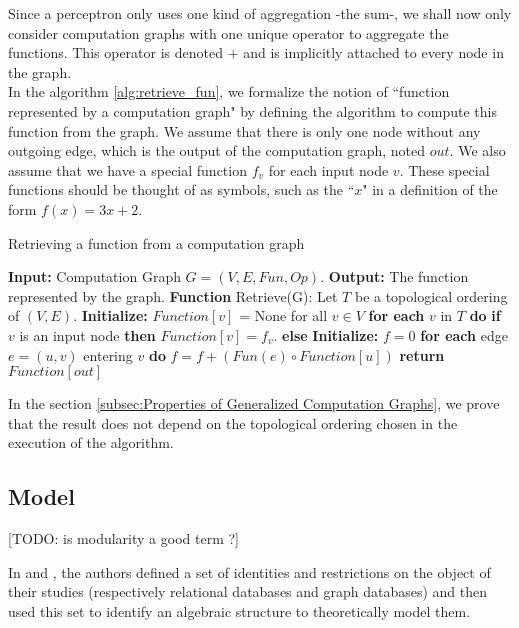 \documentclass[11pt,a4paper]{article}
\theoremstyle{definition}
\begin{document}
	Since a perceptron only uses one kind of aggregation -the sum-, we shall now only consider computation graphs with one unique operator to aggregate the functions. This operator is denoted $+$ and is implicitly attached to every node in the graph.\\

In the algorithm \ref{alg:retrieve_fun}, we formalize the notion of ``function represented by a computation graph" by defining the algorithm to compute this function from the graph. We assume that there is only one node without any outgoing edge, which is the output of the computation graph, noted $out$. We also assume that we have a special function $f_v$ for each input node $v$. These special functions should be thought of as symbols, such as the ``$x$" in a definition of the form $f(x)=3x+2$.


\begin{algorithm}
\caption{Retrieving a function from a computation graph}
\label{alg:retrieve_fun}
\begin{algorithmic}[1]
\STATE \textbf{Input:} Computation Graph $G = (V, E, Fun, Op)$.
\STATE \textbf{Output:} The function represented by the graph.
\STATE
\STATE \textbf{Function} Retrieve(G):
\STATE \quad Let $T$ be a topological ordering of $(V,E)$.
\STATE \quad \textbf{Initialize:} $Function[v]$ = None for all $v \in V$
\STATE \quad \textbf{for each} $v$ in $T$ \textbf{do}
\STATE \quad \quad \textbf{if} $v$ is an input node \textbf{then}
\STATE \quad \quad \quad $Function[v]=f_v$.
\STATE \quad \quad \textbf{else}
\STATE \quad \quad \quad \textbf{Initialize:} $f=0$
\STATE \quad \quad \quad \textbf{for each} edge $e=(u,v)$ entering $v$ \textbf{do}
\STATE \quad \quad \quad \quad $f=f + (Fun(e) \circ Function[u])$
\STATE \quad \textbf{return} $Function[out]$
\end{algorithmic}
\end{algorithm}

	In the section \ref{subsec:Properties of Generalized Computation Graphs}, we prove that the result does not depend on the topological ordering chosen in the execution of the algorithm.

\subsection{Model}

[TODO: is modularity a good term ?]

	In  and , the authors defined a set of identities and restrictions on the object of their studies (respectively relational databases and graph databases) and then used this set to identify an algebraic structure to theoretically model them.
	
\end{document}
